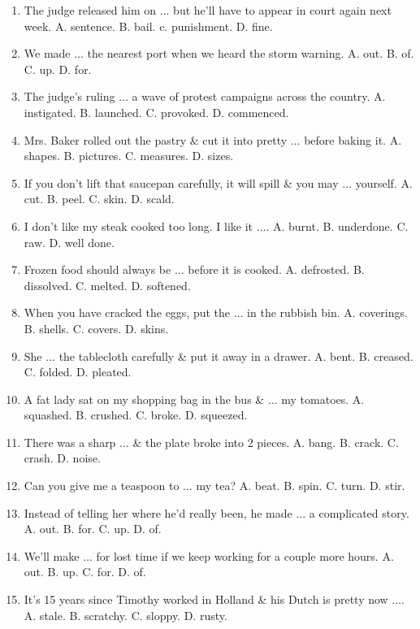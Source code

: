 \documentclass{article}
\numberwithin{equation}{section}
\begin{document}
\begin{enumerate}[leftmargin=2mm]
	\item The judge released him on $\ldots$ but he'll have to appear in court again next week. {\sf A.} sentence. {\sf B.} bail. c. punishment. {\sf D.} fine.
	\item We made $\ldots$ the nearest port when we heard the storm warning. {\sf A.} out. {\sf B.} of. {\sf C.} up. {\sf D.} for.
	\item The judge's ruling $\ldots$ a wave of protest campaigns across the country. {\sf A.} instigated. {\sf B.} launched. {\sf C.} provoked. {\sf D.} commenced.
	\item Mrs. Baker rolled out the pastry \& cut it into pretty $\ldots$ before baking it. {\sf A.} shapes. {\sf B.} pictures. {\sf C.} measures. {\sf D.} sizes.
	\item If you don't lift that saucepan carefully, it will spill \& you may $\ldots$ yourself. {\sf A.} cut. {\sf B.} peel. {\sf C.} skin. {\sf D.} scald.
	\item I don't like my steak cooked too long. I like it $\ldots$. {\sf A.} burnt. {\sf B.} underdone. {\sf C.} raw. {\sf D.} well done.
	\item Frozen food should always be $\ldots$ before it is cooked. {\sf A.} defrosted. {\sf B.} dissolved. {\sf C.} melted. {\sf D.} softened.
	\item When you have cracked the eggs, put the $\ldots$ in the rubbish bin. {\sf A.} coverings. {\sf B.} shells. {\sf C.} covers. {\sf D.} skins.
	\item She $\ldots$ the tablecloth carefully \& put it away in a drawer. {\sf A.} bent. {\sf B.} creased. {\sf C.} folded. {\sf D.} pleated.
	\item A fat lady sat on my shopping bag in the bus \& $\ldots$ my tomatoes. {\sf A.} squashed. {\sf B.} crushed. {\sf C.} broke. {\sf D.} squeezed.
	\item There was a sharp $\ldots$ \& the plate broke into 2 pieces. {\sf A.} bang. {\sf B.} crack. {\sf C.} crash. {\sf D.} noise.
	\item Can you give me a teaspoon to $\ldots$ my tea? {\sf A.} beat. {\sf B.} spin. {\sf C.} turn. {\sf D.} stir.
	\item Instead of telling her where he'd really been, he made $\ldots$ a complicated story. {\sf A.} out. {\sf B.} for. {\sf C.} up. {\sf D.} of.
	\item We'll make $\ldots$ for lost time if we keep working for a couple more hours. {\sf A.} out. {\sf B.} up. {\sf C.} for. {\sf D.} of.
	\item It's 15 years since Timothy worked in Holland \& his Dutch is pretty now $\ldots$. {\sf A.} stale. {\sf B.} scratchy. {\sf C.} sloppy. {\sf D.} rusty.

\end{enumerate}
\end{document}

